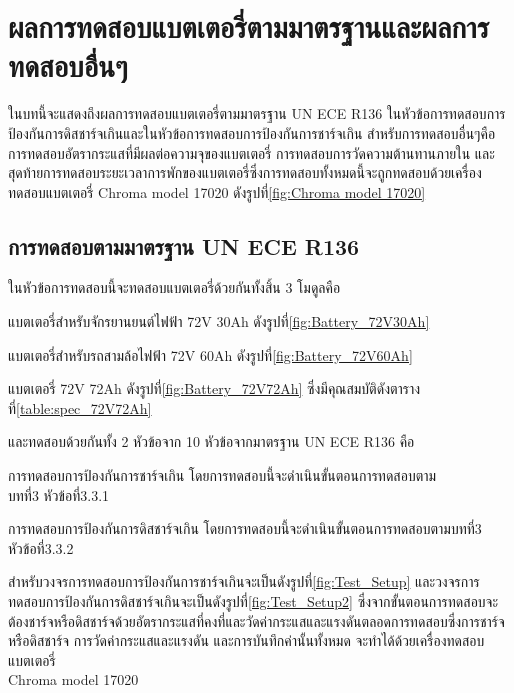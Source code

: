 \chapter{ผลการทดสอบแบตเตอรี่ตามมาตรฐานและผลการทดสอบอื่นๆ}
ในบทนี้จะแสดงถึงผลการทดสอบแบตเตอรี่ตามมาตรฐาน UN ECE R136 ในหัวข้อการทดสอบการป้องกันการดิสชาร์จเกินและในหัวข้อการทดสอบการป้องกันการชาร์จเกิน สำหรับการทดสอบอื่นๆคือ
การทดสอบอัตรากระแสที่มีผลต่อความจุของแบตเตอรี่ การทดสอบการวัดความต้านทานภายใน และสุดท้ายการทดสอบระยะเวลาการพักของแบตเตอรี่ซึ่งการทดสอบทั้งหมดนี้จะถูกทดสอบด้วยเครื่องทดสอบแบตเตอรี่
Chroma model 17020 ดังรูปที่\ref{fig:Chroma model 17020}
\section{การทดสอบตามมาตรฐาน UN ECE R136}
ในหัวข้อการทดสอบนี้จะทดสอบแบตเตอรี่ด้วยกันทั้งสิ้น 3 โมดูลคือ
\begin{itemize}
 {\item แบตเตอรี่สำหรับจักรยานยนต์ไฟฟ้า 72V 30Ah ดังรูปที่\ref{fig:Battery_72V30Ah}}
 {\item แบตเตอรี่สำหรับรถสามล้อไฟฟ้า 72V 60Ah ดังรูปที่\ref{fig:Battery_72V60Ah}}
 {\item แบตเตอรี่ 72V 72Ah ดังรูปที่\ref{fig:Battery_72V72Ah} ซึ่งมีคุณสมบัติดังตารางที่\ref{table:spec_72V72Ah}}
\end{itemize}
และทดสอบด้วยกันทั้ง 2 หัวข้อจาก 10 หัวข้อจากมาตรฐาน UN ECE R136 คือ
\begin{itemize}
 {\item การทดสอบการป้องกันการชาร์จเกิน โดยการทดสอบนี้จะดำเนินขั้นตอนการทดสอบตาม\\บทที่3 หัวข้อที่3.3.1}
 {\item การทดสอบการป้องกันการดิสชาร์จเกิน โดยการทดสอบนี้จะดำเนินขั้นตอนการทดสอบตามบทที่3 หัวข้อที่3.3.2}
\end{itemize}
สำหรับวงจรการทดสอบการป้องกันการชาร์จเกินจะเป็นดังรูปที่\ref{fig:Test_Setup} และวงจรการทดสอบการป้องกันการดิสชาร์จเกินจะเป็นดังรูปที่\ref{fig:Test_Setup2}
ซึ่งจากขั้นตอนการทดสอบจะต้องชาร์จหรือดิสชาร์จด้วยอัตรากระแสที่คงที่และวัดค่ากระแสและแรงดันตลอดการทดสอบซึ่งการชาร์จหรือดิสชาร์จ การวัดค่ากระแสและแรงดัน และการบันทึกค่านั้นทั้งหมด
จะทำได้ด้วยเครื่องทดสอบแบตเตอรี่ \\Chroma model 17020 
